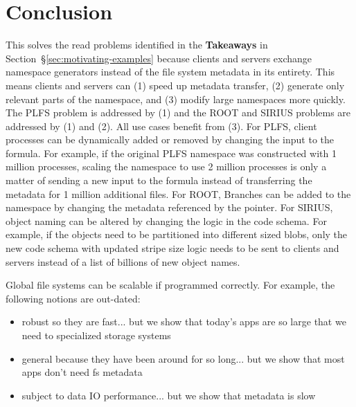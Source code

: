 \section{Conclusion}

This solves the read problems identified in the \textbf{Takeaways} in
Section~\S\ref{sec:motivating-examples} because clients and servers exchange
namespace generators instead of the file system metadata in its entirety. This
means clients and servers can (1) speed up metadata transfer, (2) generate only
relevant parts of the namespace, and (3) modify large namespaces more quickly.
The PLFS problem is addressed by (1) and the ROOT and SIRIUS problems are
addressed by (1) and (2). All use cases benefit from (3). For PLFS, client
processes can be dynamically added or removed by changing the input to the
formula.  For example, if the original PLFS namespace was constructed with 1
million processes, scaling the namespace to use 2 million processes is only a
matter of sending a new input to the formula instead of transferring the
metadata for 1 million additional files. For ROOT, Branches can be added to the
namespace by changing the metadata referenced by the pointer. For SIRIUS,
object naming can be altered by changing the logic in the code schema.  For
example, if the objects need to be partitioned into different sized blobs, only
the new code schema with updated stripe size logic needs to be sent to clients
and servers instead of a list of billions of new object names.


Global file systems can be scalable if programmed correctly. For example, the
following notions are out-dated:

\begin{itemize}
  \setlength\itemsep{-0.5em}

  \item robust so they are fast... but we show that today's apps are so large
  that we need to specialized storage systems

  \item general because they have been around for so long... but we show that
  most apps don't need fs metadata

  \item subject to data IO performance... but we show that metadata is slow

\end{itemize}


